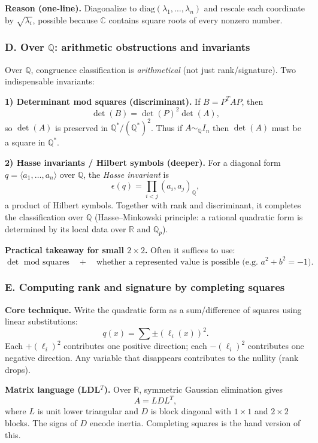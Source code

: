 \documentclass[12pt,a4paper]{article}
\theoremstyle{plain}
\theoremstyle{definition}      %
\begin{document}
\textbf{Reason (one-line).}
Diagonalize to $\mathrm{diag}(\lambda_1,\dots,\lambda_n)$ and rescale each coordinate by $\sqrt{\lambda_i}$,
possible because $\mathbb C$ contains square roots of every nonzero number.

\subsubsection*{D. Over $\mathbb Q$: arithmetic obstructions and invariants}

Over $\mathbb Q$, congruence classification is \emph{arithmetical} (not just rank/signature).
Two indispensable invariants:

\textbf{1) Determinant mod squares (discriminant).}
If $B=P^TAP$, then
\[
\det(B)=\det(P)^2\det(A),
\]
so $\det(A)$ is preserved in $\mathbb Q^*/(\mathbb Q^*)^2$.
Thus if $A\sim_{\mathbb Q}I_n$ then $\det(A)$ must be a square in $\mathbb Q^*$.

\textbf{2) Hasse invariants / Hilbert symbols (deeper).}
For a diagonal form $q=\langle a_1,\dots,a_n\rangle$ over $\mathbb Q$,
the \emph{Hasse invariant} is
\[
\epsilon(q)=\prod_{i<j}(a_i,a_j)_{\mathbb Q},
\]
a product of Hilbert symbols. Together with rank and discriminant, it completes the classification over $\mathbb Q$
(Hasse--Minkowski principle: a rational quadratic form is determined by its local data over $\mathbb R$ and $\mathbb Q_p$).

\textbf{Practical takeaway for small $2\times 2$.}
Often it suffices to use:
\[
\det \text{ mod squares} \quad + \quad \text{whether a represented value is possible (e.g.\ }a^2+b^2=-1\text{)}.
\]

\subsubsection*{E. Computing rank and signature by completing squares}

\textbf{Core technique.}
Write the quadratic form as a sum/difference of squares using linear substitutions:
\[
q(x)=\sum \pm (\ell_i(x))^2.
\]
Each $+(\ell_i)^2$ contributes one positive direction; each $-(\ell_i)^2$ contributes one negative direction.
Any variable that disappears contributes to the nullity (rank drops).

\textbf{Matrix language (LDL$^T$).}
Over $\mathbb R$, symmetric Gaussian elimination gives
\[
A = L D L^T,
\]
where $L$ is unit lower triangular and $D$ is block diagonal with $1\times 1$ and $2\times 2$ blocks.
The signs of $D$ encode inertia. Completing squares is the hand version of this.
\end{document}
